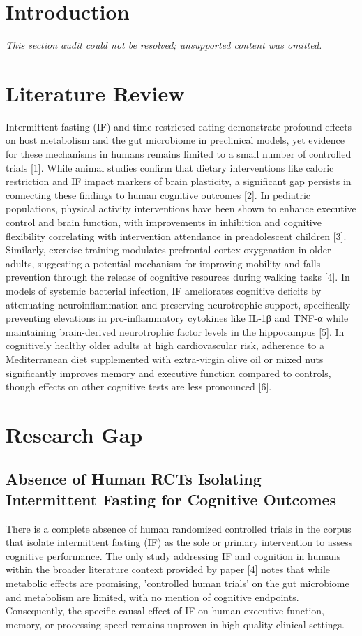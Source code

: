 \documentclass[11pt]{article}
\begin{document}
\section{Introduction}
\textit{This section audit could not be resolved; unsupported content was omitted.}

\section{Literature Review}
Intermittent fasting (IF) and time-restricted eating demonstrate profound effects on host metabolism and the gut microbiome in preclinical models, yet evidence for these mechanisms in humans remains limited to a small number of controlled trials [1]. While animal studies confirm that dietary interventions like caloric restriction and IF impact markers of brain plasticity, a significant gap persists in connecting these findings to human cognitive outcomes [2]. In pediatric populations, physical activity interventions have been shown to enhance executive control and brain function, with improvements in inhibition and cognitive flexibility correlating with intervention attendance in preadolescent children [3]. Similarly, exercise training modulates prefrontal cortex oxygenation in older adults, suggesting a potential mechanism for improving mobility and falls prevention through the release of cognitive resources during walking tasks [4]. In models of systemic bacterial infection, IF ameliorates cognitive deficits by attenuating neuroinflammation and preserving neurotrophic support, specifically preventing elevations in pro-inflammatory cytokines like IL-1β and TNF-α while maintaining brain-derived neurotrophic factor levels in the hippocampus [5]. In cognitively healthy older adults at high cardiovascular risk, adherence to a Mediterranean diet supplemented with extra-virgin olive oil or mixed nuts significantly improves memory and executive function compared to controls, though effects on other cognitive tests are less pronounced [6].

\section{Research Gap}
\subsection{Absence of Human RCTs Isolating Intermittent Fasting for Cognitive Outcomes}
There is a complete absence of human randomized controlled trials in the corpus that isolate intermittent fasting (IF) as the sole or primary intervention to assess cognitive performance. The only study addressing IF and cognition in humans within the broader literature context provided by paper [4] notes that while metabolic effects are promising, 'controlled human trials' on the gut microbiome and metabolism are limited, with no mention of cognitive endpoints. Consequently, the specific causal effect of IF on human executive function, memory, or processing speed remains unproven in high-quality clinical settings.
\end{document}
